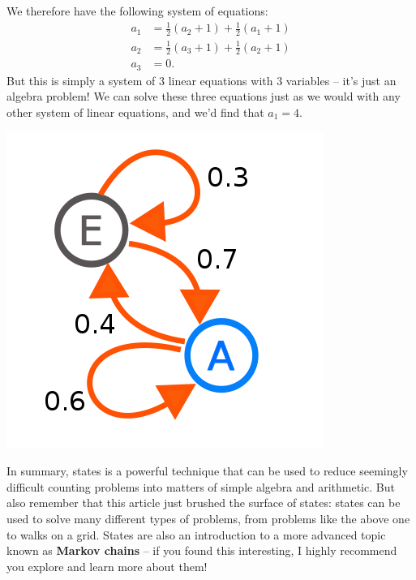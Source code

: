 \documentclass{article}
\begin{document}
We therefore have the following system of equations:
\begin{align*}
a_1&=\frac{1}{2}(a_2+1)+\frac{1}{2}(a_1+1) \\
a_2&=\frac{1}{2}(a_3+1)+\frac{1}{2}(a_2+1) \\
a_3&=0.
\end{align*}
But this is simply a system of $3$ linear equations with $3$ variables -- it's just an algebra problem! We can solve these three equations just as we would with any other system of linear equations, and we'd find that $a_1=\boxed{4}$.

\begin{center}
\includegraphics[scale=0.38]{images/finite_state.png}
\end{center}

In summary, states is a powerful technique that can be used to reduce seemingly difficult counting problems into matters of simple algebra and arithmetic. But also remember that this article just brushed the surface of states: states can be used to solve many different types of problems, from problems like the above one to walks on a grid. States are also an introduction to a more advanced topic known as \textbf{Markov chains} -- if you found this interesting, I highly recommend you explore and learn more about them!
\end{document}
